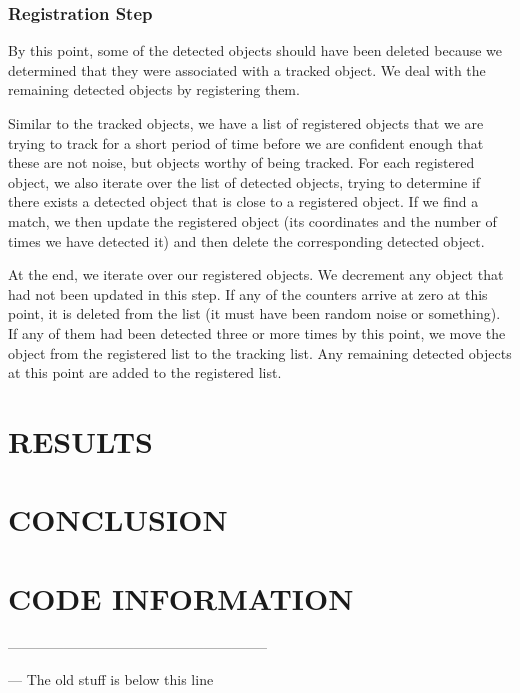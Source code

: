 \documentclass[a4paper, 10pt, conference]{ieeeconf}      %
\begin{document}
\subsubsection{Registration Step}

By this point, some of the detected objects should have been deleted because we determined that they were associated with a tracked object. We deal with the remaining detected objects by registering them. \newline

Similar to the tracked objects, we have a list of registered objects that we are trying to track for a short period of time before we are confident enough that these are not noise, but objects worthy of being tracked. For each registered object, we also iterate over the list of detected objects, trying to determine if there exists a detected object that is close to a registered object. If we find a match, we then update the registered object (its coordinates and the number of times we have detected it) and then delete the corresponding detected object. \newline

At the end, we iterate over our registered objects. We decrement any object that had not been updated in this step. If any of the counters arrive at zero at this point, it is deleted from the list (it must have been random noise or something). If any of them had been detected three or more times by this point, we move the object from the registered list to the tracking list. Any remaining detected objects at this point are added to the registered list. \newline

\section{RESULTS}


\section{CONCLUSION}


\section{CODE INFORMATION}



--------------------------------------------------------

--- The old stuff is below this line
\end{document}
